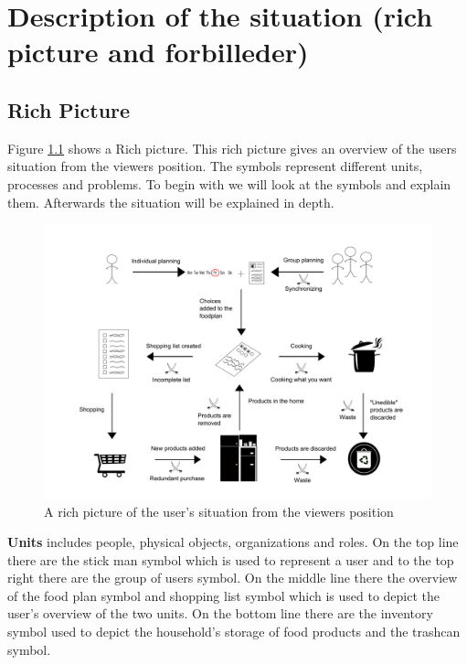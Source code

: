 \chapter{Description of the situation (rich picture and forbilleder)}

\section{Rich Picture}
Figure \ref{RigtBillede} shows a Rich picture. This rich picture gives an overview of the users situation from the viewers position. The symbols represent different units, processes and problems. To begin with we will look at the symbols and explain them. Afterwards the situation will be explained in depth.

  \begin{figure}[H]
	\centering
	\includegraphics[width=1.00\textwidth]{Grafik/FoodPlanner/InkscapeTegninger/RigtBillede.pdf}
	\caption{A rich picture of the user's situation from the viewers position}
	\label{RigtBillede}
\end{figure}
\textbf{Units} includes people, physical objects, organizations and roles. On the top line there are the stick man symbol which is used to represent a user and to the top right there are the group of users symbol. On the middle line there the overview of the food plan symbol and shopping list symbol which is used to depict the user's overview of the two units. On the bottom line there are the inventory symbol used to depict the household's storage of food products and the trashcan symbol.    

